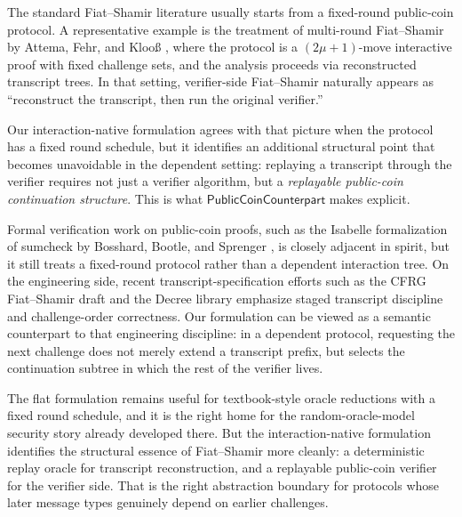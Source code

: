 \begin{remark}
  \label{int:fiat-shamir-literature}
  The standard Fiat--Shamir literature usually starts from a fixed-round
  public-coin protocol.  A representative example is the treatment of
  multi-round Fiat--Shamir by Attema, Fehr, and Kloo{\ss}
  \cite{AttemaFehrKlooss2023}, where the protocol is a $(2\mu+1)$-move
  interactive proof with fixed challenge sets, and the analysis proceeds via
  reconstructed transcript trees.  In that setting, verifier-side
  Fiat--Shamir naturally appears as ``reconstruct the transcript, then run the
  original verifier.''

  Our interaction-native formulation agrees with that picture when the protocol
  has a fixed round schedule, but it identifies an additional structural point
  that becomes unavoidable in the dependent setting: replaying a transcript
  through the verifier requires not just a verifier algorithm, but a
  \emph{replayable public-coin continuation structure}.  This is what
  $\mathsf{PublicCoinCounterpart}$ makes explicit.

  Formal verification work on public-coin proofs, such as the Isabelle
  formalization of sumcheck by Bosshard, Bootle, and Sprenger
  \cite{BBS24}, is closely adjacent in spirit, but it still treats a
  fixed-round protocol rather than a dependent interaction tree.  On the
  engineering side, recent transcript-specification efforts such as the CFRG
  Fiat--Shamir draft \cite{CFRGFiatShamir2025} and the Decree library
  \cite{Decree2024} emphasize staged transcript discipline and challenge-order
  correctness.  Our formulation can be viewed as a semantic counterpart to that
  engineering discipline: in a dependent protocol, requesting the next
  challenge does not merely extend a transcript prefix, but selects the
  continuation subtree in which the rest of the verifier lives.
\end{remark}

\begin{remark}
  The flat formulation remains useful for textbook-style oracle reductions with
  a fixed round schedule, and it is the right home for the random-oracle-model
  security story already developed there.  But the interaction-native
  formulation identifies the structural essence of Fiat--Shamir more cleanly:
  a deterministic replay oracle for transcript reconstruction, and a replayable
  public-coin verifier for the verifier side.  That is the right abstraction
  boundary for protocols whose later message types genuinely depend on earlier
  challenges.
\end{remark}
